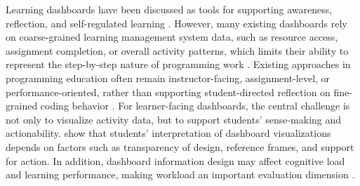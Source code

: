 \documentclass[sigconf]{acmart}
\begin{document}
Learning dashboards have been discussed as tools for supporting awareness, reflection, and self-regulated learning \cite{schwendimann2016perceiving,corrin2014exploring}. However, many existing dashboards rely on coarse-grained learning management system data, such as resource access, assignment completion, or overall activity patterns, which limits their ability to represent the step-by-step nature of programming work \cite{paulsen2024learning}. %
Existing approaches in programming education often remain instructor-facing, assignment-level, or performance-oriented, rather than supporting student-directed reflection on fine-grained coding behavior \cite{sondagar2021elearning,groher2024learning}. For learner-facing dashboards, the central challenge is not only to visualize activity data, but to support students' sense-making and actionability. \cite{jivet2020students} show that students' interpretation of dashboard visualizations depends on factors such as transparency of design, reference frames, and support for action. In addition, dashboard information design may affect cognitive load and learning performance, making workload an important evaluation dimension \cite{cheng2024influence}. %

\end{document}

